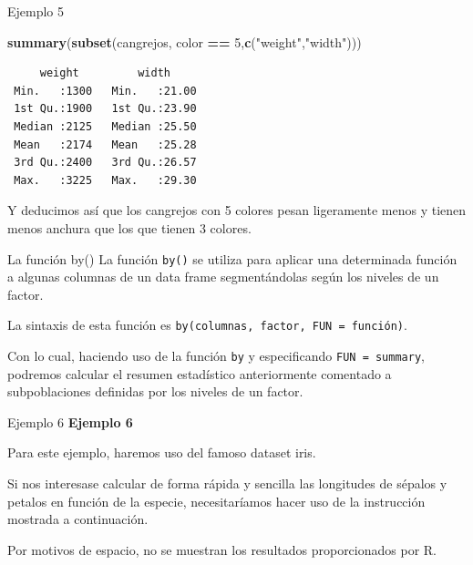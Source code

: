 \documentclass[
  ignorenonframetext,
]{beamer}
\newenvironment{Shaded}{\begin{snugshade}}{\end{snugshade}}
\newcommand{\AttributeTok}[1]{\textcolor[rgb]{0.13,0.29,0.53}{#1}}
\newcommand{\DecValTok}[1]{\textcolor[rgb]{0.00,0.00,0.81}{#1}}
\newcommand{\FunctionTok}[1]{\textcolor[rgb]{0.13,0.29,0.53}{\textbf{#1}}}
\newcommand{\NormalTok}[1]{#1}
\newcommand{\SpecialCharTok}[1]{\textcolor[rgb]{0.81,0.36,0.00}{\textbf{#1}}}
\newcommand{\StringTok}[1]{\textcolor[rgb]{0.31,0.60,0.02}{#1}}
\begin{document}
\begin{frame}[fragile]{Ejemplo 5}
\label{ejemplo-5-20}
\begin{Shaded}
\begin{Highlighting}[]
\FunctionTok{summary}\NormalTok{(}\FunctionTok{subset}\NormalTok{(cangrejos, color }\SpecialCharTok{==} \DecValTok{5}\NormalTok{,}\FunctionTok{c}\NormalTok{(}\StringTok{"weight"}\NormalTok{,}\StringTok{"width"}\NormalTok{)))}
\end{Highlighting}
\end{Shaded}

\begin{verbatim}
     weight         width      
 Min.   :1300   Min.   :21.00  
 1st Qu.:1900   1st Qu.:23.90  
 Median :2125   Median :25.50  
 Mean   :2174   Mean   :25.28  
 3rd Qu.:2400   3rd Qu.:26.57  
 Max.   :3225   Max.   :29.30  
\end{verbatim}

Y deducimos así que los cangrejos con 5 colores pesan ligeramente menos
y tienen menos anchura que los que tienen 3 colores.
\end{frame}

\begin{frame}[fragile]{La función by()}
\label{la-funciuxf3n-by}
La función \texttt{by()} se utiliza para aplicar una determinada función
a algunas columnas de un data frame segmentándolas según los niveles de
un factor.

La sintaxis de esta función es
\texttt{by(columnas,\ factor,\ FUN\ =\ función)}.

Con lo cual, haciendo uso de la función \texttt{by} y especificando
\texttt{FUN\ =\ summary}, podremos calcular el resumen estadístico
anteriormente comentado a subpoblaciones definidas por los niveles de un
factor.
\end{frame}

\begin{frame}[fragile]{Ejemplo 6}
\label{ejemplo-6}
\textbf{Ejemplo 6}

Para este ejemplo, haremos uso del famoso dataset iris.

Si nos interesase calcular de forma rápida y sencilla las longitudes de
sépalos y petalos en función de la especie, necesitaríamos hacer uso de
la instrucción mostrada a continuación.

Por motivos de espacio, no se muestran los resultados proporcionados por
R.

\begin{Shaded}
\end{Shaded}
\end{frame}
\end{document}
